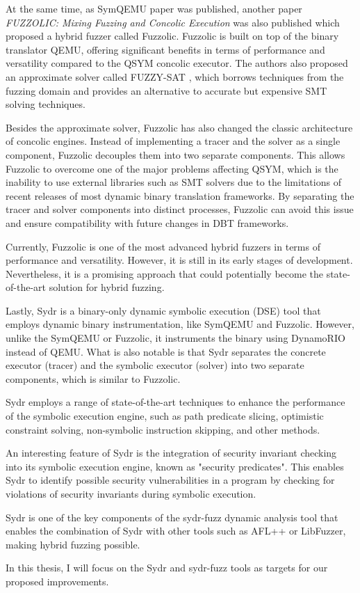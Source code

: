 
At the same time, as SymQEMU paper was published, another paper \textit{FUZZOLIC: Mixing Fuzzing and Concolic Execution} \cite{fuzzolic-hybrid-fuzzer} was also published which proposed a hybrid fuzzer called Fuzzolic. Fuzzolic is built on top of the binary translator QEMU, offering significant benefits in terms of performance and versatility compared to the QSYM concolic executor. The authors also proposed an approximate solver called FUZZY-SAT \cite{fuzzy-sat-fuzzing-symbolic-expressions}, which borrows techniques from the fuzzing domain and provides an alternative to accurate but expensive SMT solving techniques.

Besides the approximate solver, Fuzzolic has also changed the classic architecture of concolic engines. Instead of implementing a tracer and the solver as a single component, Fuzzolic decouples them into two separate components. This allows Fuzzolic to overcome one of the major problems affecting QSYM, which is the inability to use external libraries such as SMT solvers due to the limitations of recent releases of most dynamic binary translation frameworks. By separating the tracer and solver components into distinct processes, Fuzzolic can avoid this issue and ensure compatibility with future changes in DBT frameworks.

Currently, Fuzzolic is one of the most advanced hybrid fuzzers in terms of performance and versatility. However, it is still in its early stages of development. Nevertheless, it is a promising approach that could potentially become the state-of-the-art solution for hybrid fuzzing.

 \label{hybrid-fuzzing:sydr}

Lastly, Sydr \cite{sydr-cutting-edge-dynamic-symbolic-execution} is a binary-only dynamic symbolic execution (DSE) tool that employs dynamic binary instrumentation, like SymQEMU and Fuzzolic. However, unlike the SymQEMU or Fuzzolic, it instruments the binary using DynamoRIO instead of QEMU. What is also notable is that Sydr separates the concrete executor (tracer) and the symbolic executor (solver) into two separate components, which is similar to Fuzzolic.

Sydr employs a range of state-of-the-art techniques to enhance the performance of the symbolic execution engine, such as path predicate slicing, optimistic constraint solving, non-symbolic instruction skipping, and other methods.

An interesting feature of Sydr is the integration of security invariant checking into its symbolic execution engine, known as "security predicates". This enables Sydr to identify possible security vulnerabilities in a program by checking for violations of security invariants during symbolic execution.

Sydr is one of the key components of the sydr-fuzz \cite{sydr-fuzz-ispras-2022} dynamic analysis tool that enables the combination of Sydr with other tools such as AFL++ or LibFuzzer, making hybrid fuzzing possible.

In this thesis, I will focus on the Sydr and sydr-fuzz tools as targets for our proposed improvements.
